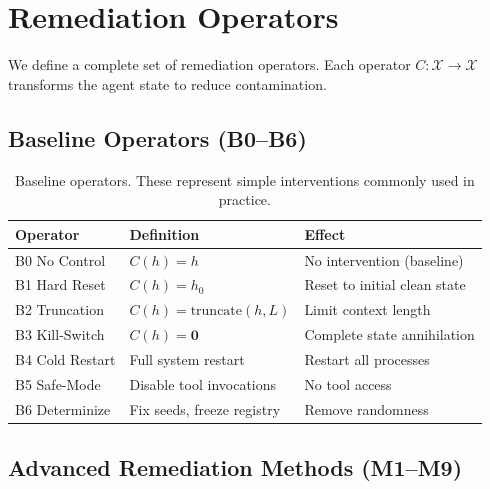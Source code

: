 \documentclass{article}
\theoremstyle{plain}
\theoremstyle{definition}
\begin{document}
\section{Remediation Operators}
\label{sec:operators}

We define a complete set of remediation operators. Each operator $C: \mathcal{X} \rightarrow \mathcal{X}$ transforms the agent state to reduce contamination.

\subsection{Baseline Operators (B0--B6)}

\begin{table}[!htbp]
\centering
\caption{Baseline operators. These represent simple interventions commonly used in practice.}
\small
\begin{tabular}{lll}
\toprule
\textbf{Operator} & \textbf{Definition} & \textbf{Effect} \\
\midrule
B0 No Control & $C(h) = h$ & No intervention (baseline) \\
B1 Hard Reset & $C(h) = h_0$ & Reset to initial clean state \\
B2 Truncation & $C(h) = \text{truncate}(h, L)$ & Limit context length \\
B3 Kill-Switch & $C(h) = \mathbf{0}$ & Complete state annihilation \\
B4 Cold Restart & Full system restart & Restart all processes \\
B5 Safe-Mode & Disable tool invocations & No tool access \\
B6 Determinize & Fix seeds, freeze registry & Remove randomness \\
\bottomrule
\end{tabular}
\end{table}

\subsection{Advanced Remediation Methods (M1--M9)}
\end{document}

